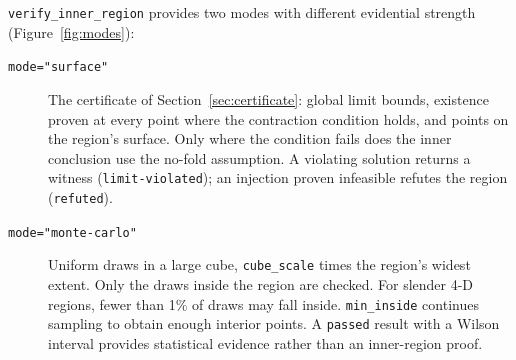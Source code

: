 \documentclass[11pt,a4paper]{report}
\newcommand{\code}[1]{\texttt{\small #1}}
\begin{document}
\code{verify\_inner\_region} provides two modes with different evidential
strength (Figure~\ref{fig:modes}):

\begin{description}
\item[\code{mode="surface"}] The certificate of Section~\ref{sec:certificate}:
  global limit bounds, existence proven at every point where the contraction
  condition holds, and points on the region's surface. Only where the condition
  fails does the inner conclusion use the no-fold assumption. A violating
  solution returns a witness (\code{limit-violated}); an injection proven
  infeasible refutes the region (\code{refuted}).
\item[\code{mode="monte-carlo"}] Uniform draws in a large cube,
  \code{cube\_scale} times the region's widest extent. Only the draws inside
  the region are checked. For slender 4-D regions, fewer than 1\% of draws may
  fall inside. \code{min\_inside} continues sampling to obtain enough interior
  points. A \code{passed} result with a Wilson interval provides statistical
  evidence rather than an inner-region proof.
\end{description}
\end{document}
